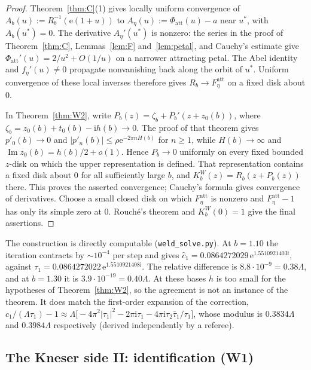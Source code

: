 \documentclass[11pt,a4paper]{article}
\theoremstyle{definition}
\newcommand{\Rr}{R}
\newcommand{\Kk}{K}
\newcommand{\eee}{\mathrm{e}}
\newcommand{\ii}{\mathrm{i}}
\begin{document}
\begin{proof}
Theorem~\ref{thm:C}(1) gives locally uniform convergence of
$A_b(u):=\Rr_b^{-1}(\eee(1+u))$ to
$A_\eta(u):=\Phi_{\mathrm{att}}(u)-a$ near $u^*$, with $A_b(u^*)=0$.
The derivative $A_\eta'(u^*)$ is nonzero: the series in the proof of
Theorem~\ref{thm:C}, Lemmas~\ref{lem:F} and~\ref{lem:petal}, and Cauchy's
estimate give $\Phi_{\mathrm{att}}'(u)=2/u^2+O(1/u)$ on a narrower
attracting petal.  The Abel identity and $f_\eta'(u)\ne0$ propagate
nonvanishing back along the orbit of $u^*$.  Uniform
convergence of these local inverses therefore gives
$\Rr_b\to F_\eta^{\mathrm{att}}$ on a fixed disk about $0$.

In Theorem~\ref{thm:W2}, write
$P_b(z)=\zeta_b+P_b'(z+z_0(b))$, where
$\zeta_b=z_0(b)+t_0(b)-\ii h(b)\to0$.  The proof of that theorem gives
$p'_0(b)\to0$ and $|p'_n(b)|\le\rho\eee^{-2\pi nH(b)}$ for $n\ge1$,
while $H(b)\to\infty$ and $\operatorname{Im}z_0(b)=h(b)/2+o(1)$.
Hence $P_b\to0$ uniformly on every fixed bounded $z$-disk on which
the upper representation is defined.  That representation contains a
fixed disk about $0$ for all sufficiently large $b$, and
$\Kk_b^W(z)=\Rr_b(z+P_b(z))$ there.  This proves the asserted convergence;
Cauchy's formula gives convergence of derivatives.  Choose a small
closed disk on which $F_\eta^{\mathrm{att}}$ is nonzero and
$F_\eta^{\mathrm{att}}-1$ has only its simple zero at $0$.
Rouch\'e's theorem and $\Kk_b^W(0)=1$ give the final assertions.
\end{proof}

\noindent
The construction is directly computable (\texttt{weld\_solve.py}).  At
$b=1.10$ the iteration contracts by $\sim10^{-4}$ per step and gives
$\hat c_1=0.0864272029\,\eee^{1.5510921403\ii}$, against
$\tau_1=0.0864272022\,\eee^{1.5510921408\ii}$.  The relative difference is
$8.8\cdot10^{-9}=0.38\Lambda$, and at $b=1.30$ it is $3.9\cdot10^{-19}=0.40\Lambda$.
At these bases $h$ is too small for the hypotheses of Theorem~\ref{thm:W2}, so
the agreement is not an instance of the theorem.  It does match the first-order
expansion of the correction,
$c_1/(\Lambda\tau_1)-1\approx\Lambda\bigl[-4\pi^2|\tau_1|^2-2\pi\ii\tau_1
-4\pi\ii\tau_2\bar\tau_1/\tau_1\bigr]$, whose modulus is $0.3834\Lambda$ and
$0.3984\Lambda$ respectively (derived independently by a referee).

\subsection{The Kneser side II: identification (W1)}\label{sec:W1}
\end{document}
